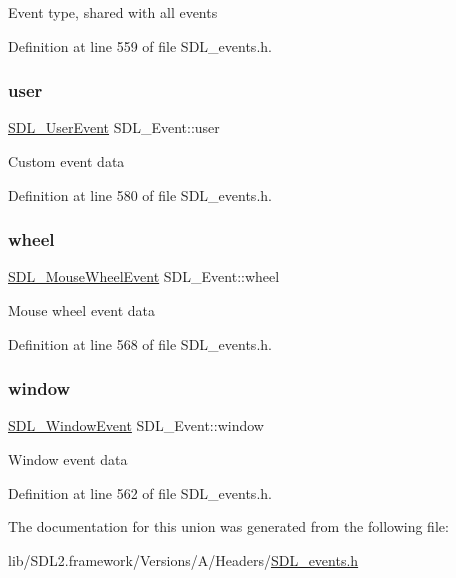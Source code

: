Event type, shared with all events 

Definition at line 559 of file S\+D\+L\+\_\+events.\+h.

\mbox{\label{union_s_d_l___event_ab7c394e3ce7bf1e4f8d68bc0e9f1b042}} 
\subsubsection{\texorpdfstring{user}{user}}
{\footnotesize\ttfamily \mbox{\hyperlink{struct_s_d_l___user_event}{S\+D\+L\+\_\+\+User\+Event}} S\+D\+L\+\_\+\+Event\+::user}

Custom event data 

Definition at line 580 of file S\+D\+L\+\_\+events.\+h.

\mbox{\label{union_s_d_l___event_a267d3f550715519ec90a81ccd0e6cbda}} 
\subsubsection{\texorpdfstring{wheel}{wheel}}
{\footnotesize\ttfamily \mbox{\hyperlink{struct_s_d_l___mouse_wheel_event}{S\+D\+L\+\_\+\+Mouse\+Wheel\+Event}} S\+D\+L\+\_\+\+Event\+::wheel}

Mouse wheel event data 

Definition at line 568 of file S\+D\+L\+\_\+events.\+h.

\mbox{\label{union_s_d_l___event_a826936b3275406d857bc6654669fae71}} 
\subsubsection{\texorpdfstring{window}{window}}
{\footnotesize\ttfamily \mbox{\hyperlink{struct_s_d_l___window_event}{S\+D\+L\+\_\+\+Window\+Event}} S\+D\+L\+\_\+\+Event\+::window}

Window event data 

Definition at line 562 of file S\+D\+L\+\_\+events.\+h.



The documentation for this union was generated from the following file\+:\begin{DoxyCompactItemize}
\item 
lib/\+S\+D\+L2.\+framework/\+Versions/\+A/\+Headers/\mbox{\hyperlink{_s_d_l__events_8h}{S\+D\+L\+\_\+events.\+h}}\end{DoxyCompactItemize}
